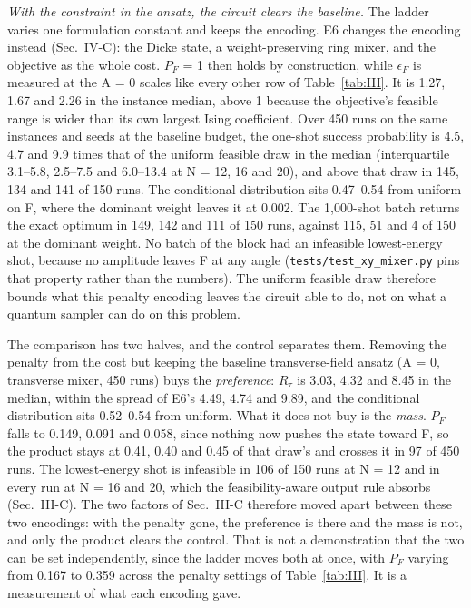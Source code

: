 \documentclass[journal]{IEEEtran}
\begin{document}
\textit{With the constraint in the ansatz, the circuit clears the baseline.} The ladder varies one formulation constant and keeps the encoding. E6 changes the encoding instead (Sec.~IV-C): the Dicke state, a weight-preserving ring mixer, and the objective as the whole cost. $P_{F}$ = 1 then holds by construction, while $\epsilon_{F}$ is measured at the A = 0 scales like every other row of Table~\ref{tab:III}. It is 1.27, 1.67 and 2.26 in the instance median, above 1 because the objective's feasible range is wider than its own largest Ising coefficient. Over 450 runs on the same instances and seeds at the baseline budget, the one-shot success probability is 4.5, 4.7 and 9.9 times that of the uniform feasible draw in the median (interquartile 3.1--5.8, 2.5--7.5 and 6.0--13.4 at N = 12, 16 and 20), and above that draw in 145, 134 and 141 of 150 runs. The conditional distribution sits 0.47--0.54 from uniform on F, where the dominant weight leaves it at 0.002. The 1,000-shot batch returns the exact optimum in 149, 142 and 111 of 150 runs, against 115, 51 and 4 of 150 at the dominant weight. No batch of the block had an infeasible lowest-energy shot, because no amplitude leaves F at any angle (\texttt{tests/test\_xy\_mixer.py} pins that property rather than the numbers). The uniform feasible draw therefore bounds what this penalty encoding leaves the circuit able to do, not on what a quantum sampler can do on this problem.


The comparison has two halves, and the control separates them. Removing the penalty from the cost but keeping the baseline transverse-field ansatz (A = 0, transverse mixer, 450 runs) buys the \textit{preference}: $R_{\tau}$ is 3.03, 4.32 and 8.45 in the median, within the spread of E6's 4.49, 4.74 and 9.89, and the conditional distribution sits 0.52--0.54 from uniform. What it does not buy is the \textit{mass}. $P_{F}$ falls to 0.149, 0.091 and 0.058, since nothing now pushes the state toward F, so the product stays at 0.41, 0.40 and 0.45 of that draw's and crosses it in 97 of 450 runs. The lowest-energy shot is infeasible in 106 of 150 runs at N = 12 and in every run at N = 16 and 20, which the feasibility-aware output rule absorbs (Sec.~III-C). The two factors of Sec.~III-C therefore moved apart between these two encodings: with the penalty gone, the preference is there and the mass is not, and only the product clears the control. That is not a demonstration that the two can be set independently, since the ladder moves both at once, with $P_{F}$ varying from 0.167 to 0.359 across the penalty settings of Table~\ref{tab:III}. It is a measurement of what each encoding gave.
\end{document}
